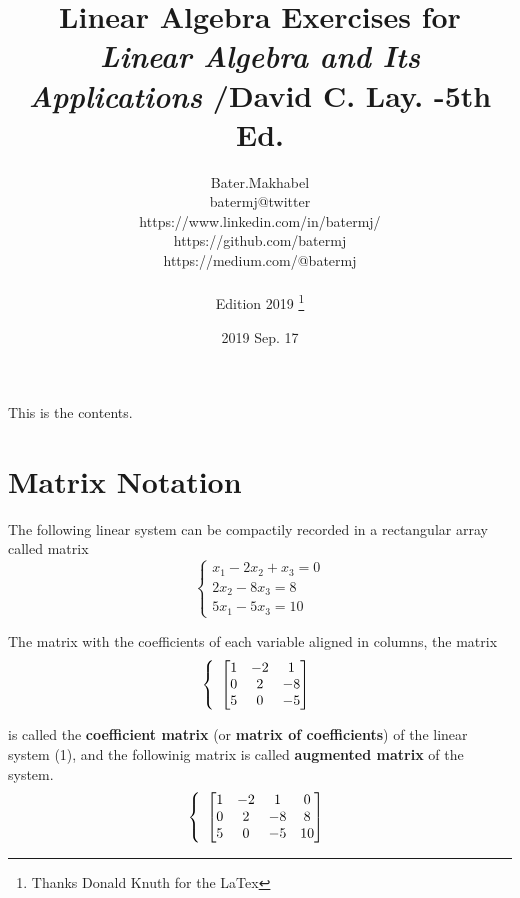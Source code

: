 \documentclass[12pt, letterpaper]{book}
\title{Linear Algebra Exercises for \emph{Linear Algebra and Its Applications} /David C. Lay. -5th Ed.}
\author{Bater.Makhabel \\batermj@twitter 
\\https://www.linkedin.com/in/batermj/ \\https://github.com/batermj \\https://medium.com/@batermj \\\\Edition 2019 \thanks{Thanks Donald Knuth for the LaTex}}
\date{2019 Sep. 17}
\begin{document}
\begin{titlepage}
\thispagestyle{empty} 
\end{titlepage}

\tableofcontents

\begin{comment}
This text won't show up in the compiled pdf
this is just a multi-line comment. Useful
to, for instance, comment out slow-rendering
while working on the draft.
\end{comment}

\newpage

This is the contents.

\setcounter{page}{1} 

\newpage
\section {Matrix Notation}

The following linear system can be compactily recorded in a rectangular array called matrix
\begin{equation}
\left\{
\begin{array}{l}
x_{1} - 2x_{2} + x_{3}  = 0\\
2x_{2} - 8x_{3} = 8\\
5x_{1} - 5x_{3} = 10
\end{array}
\right. 
\end{equation}



The matrix with the coefficients of each variable aligned in columns, the matrix
\begin{equation}
\left\{
\begin{array}{l}
$$\begin{bmatrix} 1 & -2 & 1 \\ 0 & 2 & -8 \\ 5 & 0 & -5 \end{bmatrix}$$
\end{array}
\right. 
\end{equation}


is called the \textbf{coefficient matrix} (or \textbf{matrix of coefficients}) of the linear system (1), and the followinig matrix is called \textbf{augmented matrix} of the system.
\begin{equation}
\left\{
\begin{array}{l}
$$\begin{bmatrix} 1 & -2 & 1 & 0\\ 0 & 2 & -8 & 8\\ 5 & 0 & -5 &10
\end{bmatrix}$$
\end{array}
\right. 
\end{equation}
\end{document}
